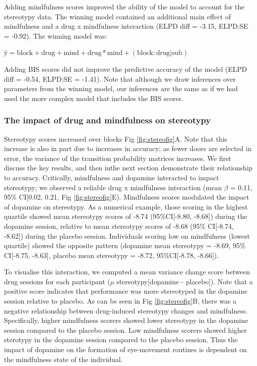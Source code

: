 \documentclass{article}
\begin{document}
Adding mindfulness scores improved the ability of the model to account
for the stereotypy data. The winning model contained an additional main
effect of mindfulness and a drug x mindfulness interaction (ELPD diff =
-3.15, ELPD:SE = -0.92). The winning model was:

\(\mathrm{\hat{y}} = \mathrm{block} + \mathrm{drug} + \mathrm{mind} + \mathrm{drug*mind} + \mathrm{(block:drug|sub)}\)

Adding BIS scores did not improve the predictive accuracy of the model
(ELPD diff = -0.54, ELPD:SE = -1.41). Note that although we draw
inferences over parameters from the winning model, our inferences are
the same as if we had used the more complex model that includes the BIS
scores.

\hypertarget{the-impact-of-drug-and-mindfulness-on-stereotypy}{%
\subsubsection{The impact of drug and mindfulness on
stereotypy}\label{the-impact-of-drug-and-mindfulness-on-stereotypy}}

Stereotypy scores increased over blocks Fig \ref{fig:stereofig}A. Note
that this increase is also in part due to increases in accuracy; as
fewer doors are selected in error, the variance of the transition
probability matrices increases. We first discuss the key results, and
then inthe next section demonstrate their relationship to accuracy.
Critically, mindfulness and dopamine interacted to impact stereotypy; we
observed a reliable drug x mindfulness interaction (mean \(\beta\) =
0.11, 95\% CI{[}0.02, 0.21, Fig \ref{fig:stereofig}E). Mindfulness
scores modulated the impact of dopamine on stereotypy. As a numerical
example, those scoring in the highest quartile showed mean stereotypy
scores of -8.74 (95\%CI{[}-8.80, -8.68{]}) during the dopamine session,
relative to mean stereotypy scores of -8.68 (95\% CI{[}-8.74, -8.62{]})
during the placebo session. Individuals scoring low on mindfulness
(lowest quartile) showed the opposite pattern (dopamine mean stereotypy
= -8.69, 95\% CI{[}-8.75, -8.63{]}, placebo mean stereotypy = -8.72,
95\%CI{[}-8.78, -8.66{]}).

To visualise this interaction, we computed a mean variance change score
between drug sessions for each participant (\(\mu\)
stereotypy{[}dopamine - placebo{]}). Note that a positive score
indicates that performance was more stereotyped in the dopamine session
relative to placebo. As can be seen in Fig \ref{fig:stereofig}B, there
was a negative relationship between drug-induced stereotypy changes and
mindfulness. Specifically, higher mindfulness scorers showed lower
stereotypy in the dopamine session compared to the placebo session. Low
mindfulness scorers showed higher sterotypy in the dopamine session
compared to the placebo session. Thus the impact of dopamine on the
formation of eye-movement routines is dependent on the mindfulness state
of the individual.
\end{document}
